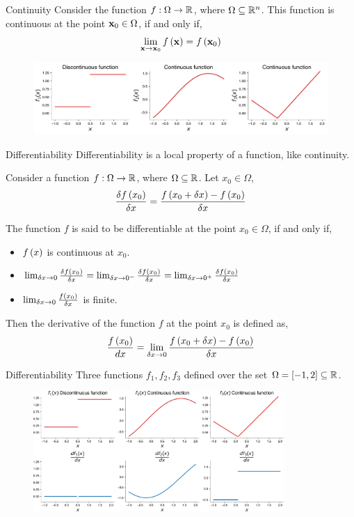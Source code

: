 \documentclass[aspectratio=169]{beamer}
\let\olditem\item
\renewcommand{\item}{\setlength{\itemsep}{\fill}\olditem}
\def\mf{\ensuremath\mathbf}
\def\mb{\ensuremath\mathbb}
\def\lp{\ensuremath\left(}
\def\rp{\ensuremath\right)}
\def\R{\ensuremath\mb{R}}
\newcommand{\ct}[1]{\lp #1\rp}
\begin{document}
\begin{frame}[t]{Continuity}
  Consider the function $f: \Omega \to \R$, where $\Omega \subseteq \R^n$. This function is continuous at the point $\mf{x}_0 \in \Omega$, if and only if, 
  \[ \lim_{\mf{x} \to \mf{x}_0} f\ct{\mf{x}} = f\ct{\mf{x}_0} \]
  
  \begin{figure}
    \centering
    \includegraphics[width=\textwidth]{figs/func_cont.pdf}
  \end{figure}
\end{frame}


\begin{frame}[t]{Differentiability}
  Differentiability is a local property of a function, like continuity. 
  
  Consider a function $f: \Omega \to \R$, where $\Omega \subseteq \R$. Let $x_0 \in \Omega$,
  \[ \frac{\delta f\ct{x_0}}{\delta x} = \frac{f\ct{x_0 + \delta x} - f\ct{x_0}}{\delta x} \]

  The function $f$ is said to be differentiable at the point $x_0 \in \Omega$, if and only if,
  \begin{itemize}
    \item $f\ct{x}$ is continuous at $x_0$.
    \item $\lim_{\delta x \to 0} \frac{\delta f\ct{x_0}}{\delta x} = \lim_{\delta x \to 0^-}\frac{\delta f\ct{x_0}}{\delta x}  = \lim_{\delta x \to 0^+} \frac{\delta f\ct{x_0}}{\delta x}$
    \item $\lim_{\delta x \to 0} \frac{f\ct{x_0}}{\delta x}$ is finite.
  \end{itemize}

  Then the derivative of the function  $f$ at the point $x_0$ is defined as,
  \[ \frac{f\ct{x_0}}{dx} = \lim_{\delta x \to 0} \frac{f\ct{x_0 + \delta x} - f\ct{x_0}}{\delta x} \]
\end{frame}


\begin{frame}[t]{Differentiability}
  Three functions $f_1, f_2, f_3$ defined over the set $\Omega = \left[ -1, 2\right] \subseteq \R$.
  
  \begin{figure}
    \centering
    \includegraphics[width=0.85\textwidth]{figs/func_diff.pdf}
  \end{figure}
\end{frame}
\end{document}
